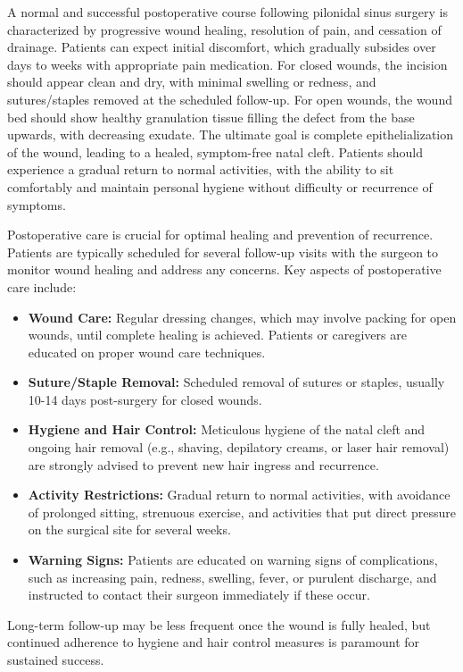 A normal and successful postoperative course following pilonidal sinus surgery is characterized by progressive wound healing, resolution of pain, and cessation of drainage. Patients can expect initial discomfort, which gradually subsides over days to weeks with appropriate pain medication. For closed wounds, the incision should appear clean and dry, with minimal swelling or redness, and sutures/staples removed at the scheduled follow-up. For open wounds, the wound bed should show healthy granulation tissue filling the defect from the base upwards, with decreasing exudate. The ultimate goal is complete epithelialization of the wound, leading to a healed, symptom-free natal cleft. Patients should experience a gradual return to normal activities, with the ability to sit comfortably and maintain personal hygiene without difficulty or recurrence of symptoms.

Postoperative care is crucial for optimal healing and prevention of recurrence. Patients are typically scheduled for several follow-up visits with the surgeon to monitor wound healing and address any concerns. Key aspects of postoperative care include:

\begin{itemize}
  \item \textbf{Wound Care:} Regular dressing changes, which may involve packing for open wounds, until complete healing is achieved. Patients or caregivers are educated on proper wound care techniques.
  \item \textbf{Suture/Staple Removal:} Scheduled removal of sutures or staples, usually 10-14 days post-surgery for closed wounds.
  \item \textbf{Hygiene and Hair Control:} Meticulous hygiene of the natal cleft and ongoing hair removal (e.g., shaving, depilatory creams, or laser hair removal) are strongly advised to prevent new hair ingress and recurrence.
  \item \textbf{Activity Restrictions:} Gradual return to normal activities, with avoidance of prolonged sitting, strenuous exercise, and activities that put direct pressure on the surgical site for several weeks.
  \item \textbf{Warning Signs:} Patients are educated on warning signs of complications, such as increasing pain, redness, swelling, fever, or purulent discharge, and instructed to contact their surgeon immediately if these occur.
\end{itemize}
Long-term follow-up may be less frequent once the wound is fully healed, but continued adherence to hygiene and hair control measures is paramount for sustained success.

